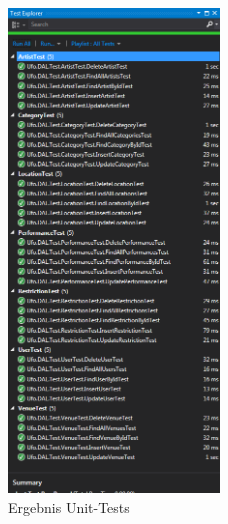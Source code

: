 \documentclass[12pt, a4paper]{article}
\begin{document}
\begin{figure}[h] 	
	\centering
		\includegraphics[width=0.5\textwidth]{UnitTests.png}
	\caption{Ergebnis Unit-Tests}
\end{figure}
\end{document}
